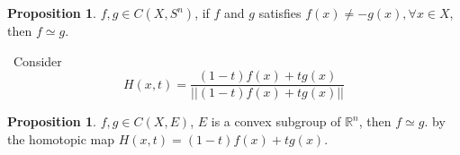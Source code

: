 \documentclass[12pt,a4paper]{book}
\newenvironment{prooff}{{\noindent\it\textcolor{cyan!40!black}{Proof}:}\,}{\par}
\newcommand{\bb}[1]{\mathbb{#1}}
\theoremstyle{definition}
\newtheorem{theo}[defn]{Theorem}
\newtheorem{prop}[defn]{Proposition}
\begin{document}
\begin{prop}
    $f,g\in C(X,S^n)$, if $f$ and $g$ satisfies $f(x)\neq -g(x),\forall x\in X$, then $f\simeq g$.
\end{prop}
\begin{prooff}
    Consider
    \begin{equation*}
        H(x,t)=\frac{(1-t)f(x)+tg(x)}{||(1-t)f(x)+tg(x)||}
    \end{equation*}
\end{prooff}
\begin{prop}
    $f,g\in C(X,E)$, $E$ is a convex subgroup of $\bb{R}^n$, then $f\simeq g$.
    by the homotopic map $H(x,t)=(1-t)f(x)+tg(x)$.
\end{prop}


\end{document}
